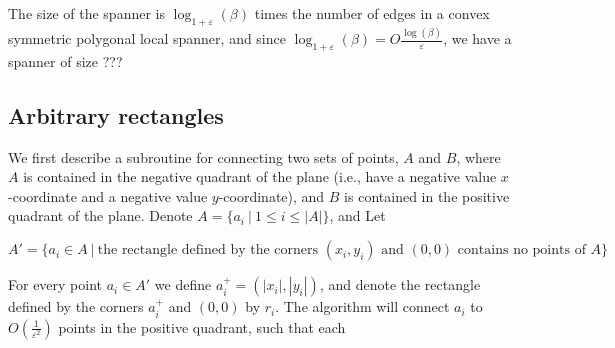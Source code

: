 \documentclass{article}
\newcommand{\eps}{\varepsilon}
\begin{document}
	The size of the spanner is $\log_{1+\eps}(\beta)$ times the number of edges in a convex symmetric polygonal local spanner, and since $\log_{1+\eps}(\beta)=O\frac{\log(\beta)}{\eps}$, we have a spanner of size ???
	
	
	\subsection{Arbitrary rectangles}
	
	We first describe a subroutine for connecting two sets of points, $A$ and $B$, where $A$ is contained in the negative quadrant of the plane (i.e., have a negative value $x$-coordinate and a negative value $y$-coordinate), and $B$ is contained in the positive quadrant of the plane. Denote $A=\{a_i~|~ 1\leq i \leq |A|\}$, and Let
	
	$$A' = \{a_i\in A~|~ \text{the rectangle defined by the corners }(x_i,y_i)\text{ and } (0,0)\text{ contains no points of }A\}$$
	
	For every point $a_i\in A'$ we define $a_i^+=(|x_i|,|y_i|)$, and denote the rectangle defined by the corners $a_i^+$ and $(0,0)$ by $r_i$. The algorithm will connect $a_i$ to $O\left(\frac{1}{\eps^2}\right)$ points in the positive quadrant, such that each 
	
\end{document}
